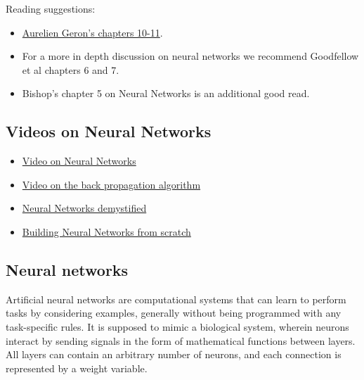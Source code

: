 \documentclass[%
oneside,                 %
final,                   %
10pt]{article}
\begin{document}
Reading suggestions:
\begin{itemize}
\item \href{{https://github.com/CompPhysics/MachineLearning/blob/master/doc/Textbooks/TensorflowML.pdf}}{Aurelien Geron's chapters 10-11}.

\item For a more in depth discussion on  neural networks we recommend Goodfellow et al chapters 6 and 7. 

\item Bishop's chapter 5 on Neural Networks is an additional good read.
\end{itemize}

\noindent
\subsection{Videos on Neural Networks}

\begin{itemize}
\item \href{{https://www.youtube.com/watch?v=CqOfi41LfDw}}{Video on Neural Networks}

\item \href{{https://www.youtube.com/watch?v=Ilg3gGewQ5U}}{Video on the back propagation algorithm}

\item \href{{https://www.youtube.com/watch?v=bxe2T-V8XRs&list=PLiaHhY2iBX9hdHaRr6b7XevZtgZRa1PoU&ab_channel=WelchLabs}}{Neural Networks demystified}

\item \href{{https://www.youtube.com/watch?v=Wo5dMEP_BbI&list=PLQVvvaa0QuDcjD5BAw2DxE6OF2tius3V3&ab_channel=sentdex}}{Building Neural Networks from scratch}
\end{itemize}

\noindent
\subsection{Neural networks}

Artificial neural networks are computational systems that can learn to
perform tasks by considering examples, generally without being
programmed with any task-specific rules. It is supposed to mimic a
biological system, wherein neurons interact by sending signals in the
form of mathematical functions between layers. All layers can contain
an arbitrary number of neurons, and each connection is represented by
a weight variable.

\end{document}
